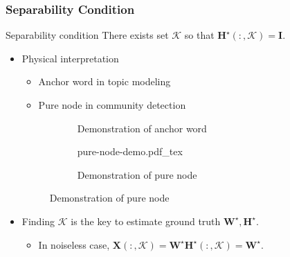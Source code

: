 \documentclass[10pt,xcolor={usenames,dvipsnames,table}]{beamer}
\def\blue{\color{blue}}
\newcommand{\citep}[1]{{\blue \scriptsize \parencite{#1}}}
\begin{document}
\begin{frame}
\frametitle{Separability Condition}
\begin{block}{Separability condition}
    There exists set $\mathcal{K}$ so that $\bm{H}^{\star}(:, \mathcal{K}) = \bm{I}$. 
\end{block}
\begin{itemize}
    \item Physical interpretation
\begin{itemize}
    \item Anchor word \citep{arora2012learning} in topic modeling
    \item Pure node \citep{mao2017mixed} in community detection
\end{itemize}
\begin{figure}[ht]
    \centering
    \begin{subfigure}[b]{0.55\textwidth}
    \centering
    \caption*{Demonstration of anchor word}
    \end{subfigure}
    \begin{subfigure}[b]{0.30\textwidth}
    \centering
    { \fontsize{7pt}{9pt}\selectfont%
    \def\svgwidth{\columnwidth}
    {pure-node-demo.pdf_tex} }
    \caption*{Demonstration of pure node}
    \end{subfigure}
\end{figure}

\item Finding $\mathcal{K}$ is the key to estimate ground truth $\bm{W}^{\star}, \bm{H}^{\star}$.

    \begin{itemize}
        \item In noiseless case, $\bm{X}(:, \mathcal{K}) = \bm{W}^{\star} \bm{H}^{\star}(:, \mathcal{K}) = \bm{W}^{\star}$.
    \end{itemize}
\end{itemize}


\end{frame}
\end{document}
